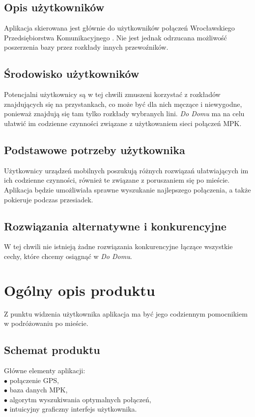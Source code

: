 \documentclass[12pt,a4paper]{article}
\begin{document}
	\subsection{Opis użytkowników }
	Aplikacja skierowana jest głównie do użytkowników połączeń Wrocławskiego Przedsiębiorstwa Komunikacyjnego \cite{MPK}. Nie jest jednak odrzucana możliwość poszerzenia bazy przez rozkłady innych przewoźników.

	\subsection{Środowisko użytkowników}
Potencjalni użytkownicy są w tej chwili zmuszeni korzystać z rozkładów znajdujących się na przystankach, co może być dla nich męczące i niewygodne, ponieważ znajdują się tam tylko rozkłady wybranych lini. \textit{Do Domu} ma na celu ułatwić im codzienne czynności związane z użytkowaniem sieci połączeń MPK.
	
	\subsection{Podstawowe potrzeby użytkownika }

Użytkownicy urządzeń mobilnych poszukują różnych rozwiązań ułatwiających im ich codzienne czynności, również te związane z poruszaniem się po mieście. Aplikacja będzie umożliwiała sprawne wyszukanie najlepszego połączenia, a także pokieruje podczas przesiadek.
	
	\subsection{Rozwiązania alternatywne i konkurencyjne}
	W tej chwili nie istnieją żadne rozwiązania konkurencyjne łączące wszystkie cechy, które chcemy osiągnąć w \textit{Do Domu}.
	\newpage

    \section{Ogólny opis produktu}

Z punktu widzenia użytkownika aplikacja ma być jego codziennym pomocnikiem w podróżowaniu po mieście. 

	\subsection{Schemat produktu}
	Główne elementy aplikacji: \\
	$\bullet$ połączenie GPS, \\
	$\bullet$ baza danych MPK, \\
	$\bullet$ algorytm wyszukiwania optymalnych połączeń, \\
	$\bullet$ intuicyjny graficzny interfejs użytkownika.	
 
\end{document}
